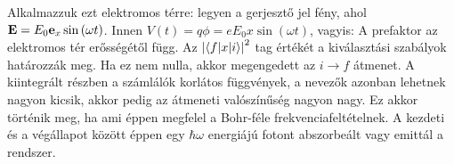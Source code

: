    Alkalmazzuk ezt elektromos térre: legyen a gerjesztő jel fény, ahol $\mathbf{E}=E_0\mathbf{e}_x\sin{(\omega t)}$. Innen $V(t)=q\phi=eE_0x\sin{(\omega t)}$, vagyis:
   A prefaktor az elektromos tér erősségétől függ. Az $\left\lvert\langle f\rvert x\lvert i\rangle\right\rvert^2$ tag értékét a kiválasztási szabályok határozzák meg. Ha ez nem nulla, akkor megengedett az $i\to f$ átmenet. A kiintegrált részben a számlálók korlátos függvények, a nevezők azonban lehetnek nagyon kicsik, akkor pedig az átmeneti valószínűség nagyon nagy. Ez akkor történik meg, ha 
   ami éppen megfelel a Bohr-féle frekvenciafeltételnek. A kezdeti és a végállapot között éppen egy $\hbar\omega$ energiájú fotont abszorbeált vagy emittál a rendszer.